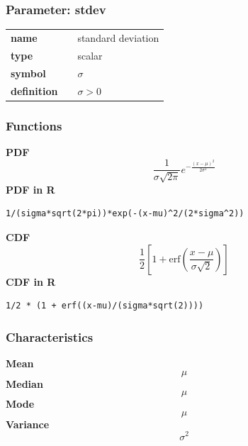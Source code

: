 \subsubsection*{Parameter: stdev}

\noindent\begin{tabular}{p{2cm}cl}
\textbf{name} & & standard deviation \\
\textbf{type} & & scalar \\
\textbf{symbol} & & $\sigma$  \\
\textbf{definition} & & $\sigma> 0$
\end{tabular}
\subsubsection*{Functions}

\smallskip \noindent \hspace{.2cm} \textbf{PDF} 
\begin{equation*}\frac{1}{\sigma \sqrt{2 \pi}}e^{-\frac{(x-\mu)^2}{2\sigma^2}}\end{equation*}
\smallskip \noindent \hspace{.2cm} \textbf{PDF in R}  
\begin{verbatim}1/(sigma*sqrt(2*pi))*exp(-(x-mu)^2/(2*sigma^2))\end{verbatim}
\smallskip \noindent \hspace{.2cm} \textbf{CDF} 
\begin{equation*}\frac12\left[1 + \text{erf}\left( \frac{x-\mu}{\sigma\sqrt{2}}\right)\right]\end{equation*}
\smallskip \noindent \hspace{.2cm} \textbf{CDF in R} 
\begin{verbatim}1/2 * (1 + erf((x-mu)/(sigma*sqrt(2))))\end{verbatim}
\smallskip
\subsubsection*{Characteristics}
\smallskip \noindent \hspace{.2cm} \textbf{Mean} 
\begin{equation*}\mu\end{equation*}
\smallskip \noindent \hspace{.2cm} \textbf{Median} 
\begin{equation*}\mu\end{equation*}
\smallskip \noindent \hspace{.2cm} \textbf{Mode} 
\begin{equation*}\mu\end{equation*}
\smallskip \noindent \hspace{.2cm} \textbf{Variance} 
\begin{equation*}\sigma^2\end{equation*}
\smallskip
